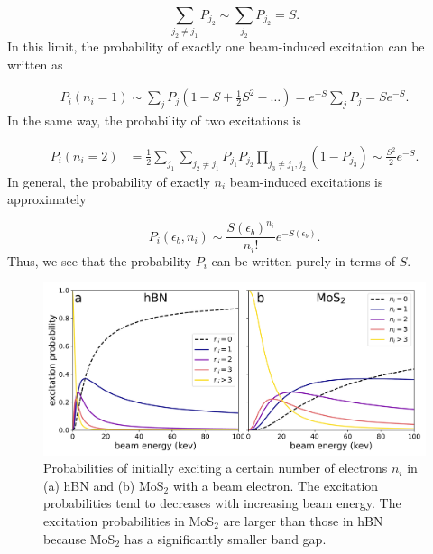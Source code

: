 \documentclass{article}
\begin{document}
\begin{equation}
  \sum_{j_2\neq j_1}P_{j_2}
  \sim
  \sum_{j_2}P_{j_2}
  =
  S.
\end{equation}
%
In this limit, the probability of exactly one beam-induced excitation can be
written as

\begin{equation}
  \begin{aligned}
  P_i(n_i=1)
  \sim
  \sum_j P_j
  \left( 1 - S + \frac{1}{2}S^2 - \dots \right)
  =
  e^{-S}\sum_j P_j
  =
  Se^{-S}.
\end{aligned}
\label{eq:Pi(1)}
\end{equation}
%
In the same way, the probability of two excitations is

\begin{equation}
\begin{aligned}
  P_i(n_i=2)
  &=
  \frac{1}{2} \sum_{j_1} \sum_{j_2\neq j_1} P_{j_1} P_{j_2}
  \prod_{j_3\neq j_1,j_2} (1 - P_{j_3})
  \sim
  \frac{S^2}{2}e^{-S}.
\end{aligned}
\end{equation}
%
In general, the probability of exactly $n_i$ beam-induced excitations is
approximately

\begin{equation}
  P_i(\epsilon_b, n_i)
  \sim
  \frac{S(\epsilon_b)^{n_i}}{n_i!}
  e^{-S(\epsilon_b)}.
  \label{eq:Pi}
\end{equation}
%
Thus, we see that the probability $P_i$ can be written purely in terms of $S$.

\begin{figure}
  \centering
  \includegraphics[width=.9\textwidth]{figures/exciProbs_overlap.pdf}
  \caption{
    Probabilities of initially exciting a certain number of electrons $n_i$ in
    (a) hBN and (b) MoS$_2$ with a beam electron.
    The excitation probabilities tend to decreases with increasing beam energy.
    The excitation probabilities in MoS$_2$ are larger than those in hBN
    because MoS$_2$ has a significantly smaller band gap.
  } 
  \label{fig:Pi}
\end{figure}
\end{document}
